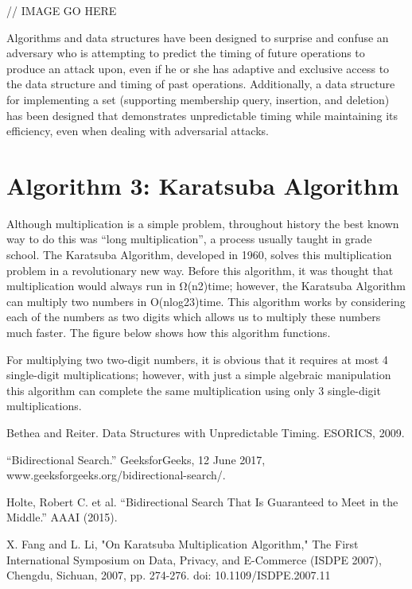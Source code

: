 \documentclass{article}
\begin{document}
    // IMAGE GO HERE

	Algorithms and data structures have been designed to surprise and confuse an adversary who is attempting to predict the timing of future operations to produce an attack upon, even if he or she has adaptive and exclusive access to the data structure and timing of past operations. Additionally, a data structure for implementing a set (supporting membership query, insertion, and deletion) has been designed that demonstrates unpredictable timing while maintaining its efficiency, even when dealing with adversarial attacks.

\section{Algorithm 3: Karatsuba Algorithm}

    Although multiplication is a simple problem, throughout history the best known way to do this was “long multiplication”, a process usually taught in grade school. The Karatsuba Algorithm, developed in 1960, solves this multiplication problem in a revolutionary new way. Before this algorithm, it was thought that multiplication would always run in Ω(n2)time; however, the Karatsuba Algorithm can multiply two numbers in O(nlog23)time. This algorithm works by considering each of the numbers as two digits which allows us to multiply these numbers much faster. The figure below shows how this algorithm functions.

	For multiplying two two-digit numbers, it is obvious that it requires at most 4 single-digit multiplications; however, with just a simple algebraic manipulation this algorithm can complete the same multiplication using only 3 single-digit multiplications.



Bethea and Reiter. Data Structures with Unpredictable Timing. ESORICS, 2009.

“Bidirectional Search.” GeeksforGeeks, 12 June 2017, www.geeksforgeeks.org/bidirectional-search/.

Holte, Robert C. et al. “Bidirectional Search That Is Guaranteed to Meet in the Middle.” AAAI (2015).

X. Fang and L. Li, "On Karatsuba Multiplication Algorithm," The First International Symposium on Data, Privacy, and E-Commerce (ISDPE 2007), Chengdu, Sichuan, 2007, pp. 274-276. doi: 10.1109/ISDPE.2007.11
\end{document}

